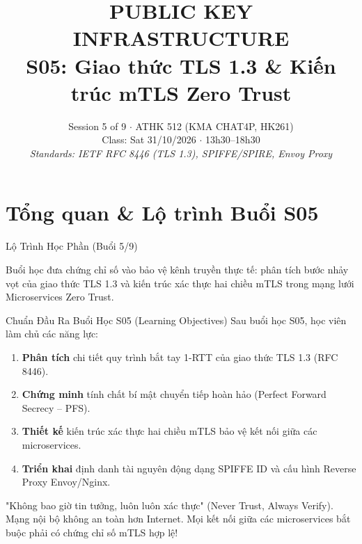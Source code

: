 
\title{\color{hcmutblue}\textbf{\LARGE PUBLIC KEY INFRASTRUCTURE}\\[0.25em]
       \color{hcmutblue}\textbf{\large S05: Giao thức TLS 1.3 \& Kiến trúc mTLS Zero Trust}}
\date{\footnotesize Session 5 of 9 $\cdot$ ATHK 512 (KMA CHAT4P, HK261)\\
      Class: Sat 31/10/2026 $\cdot$ 13h30--18h30\\
      \textit{Standards: IETF RFC 8446 (TLS 1.3), SPIFFE/SPIRE, Envoy Proxy}}


\PKItitleframe

\section{Tổng quan \& Lộ trình Buổi S05}

\begin{frame}{Lộ Trình Học Phần (Buổi 5/9)}
  \centering
  \vspace{0.4em}
  \raggedright\small
  Buổi học đưa chứng chỉ số vào bảo vệ kênh truyền thực tế: phân tích bước nhảy vọt của giao thức TLS 1.3 và kiến trúc xác thực hai chiều mTLS trong mạng lưới Microservices Zero Trust.
\end{frame}

\begin{frame}{Chuẩn Đầu Ra Buổi Học S05 (Learning Objectives)}
  \small
  Sau buổi học S05, học viên làm chủ các năng lực:
  \begin{enumerate}
    \item \textbf{Phân tích} chi tiết quy trình bắt tay 1-RTT của giao thức TLS 1.3 (RFC 8446).
    \item \textbf{Chứng minh} tính chất bí mật chuyển tiếp hoàn hảo (Perfect Forward Secrecy -- PFS).
    \item \textbf{Thiết kế} kiến trúc xác thực hai chiều mTLS bảo vệ kết nối giữa các microservices.
    \item \textbf{Triển khai} định danh tài nguyên động dạng SPIFFE ID và cấu hình Reverse Proxy Envoy/Nginx.
  \end{enumerate}

  \begin{keybox}
    "Không bao giờ tin tưởng, luôn luôn xác thực" (Never Trust, Always Verify). Mạng nội bộ không an toàn hơn Internet. Mọi kết nối giữa các microservices bắt buộc phải có chứng chỉ số mTLS hợp lệ!
  \end{keybox}
\end{frame}

